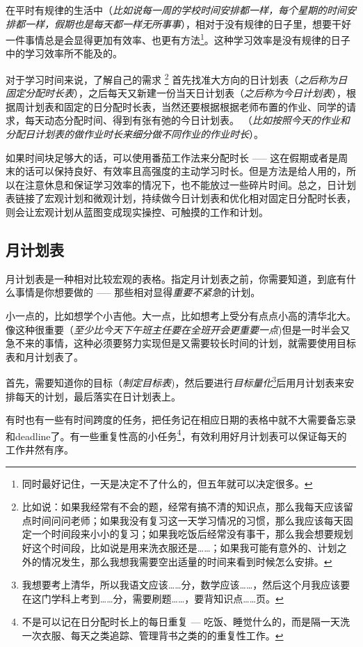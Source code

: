 \documentclass[b5paper]{ctexart}
\begin{document}
			在平时有规律的生活中（\emph{比如说每一周的学校时间安排都一样，每个星期的时间安排都一样，假期也是每天都一样{\color[gray]{0.5}无所事事}}），相对于没有规律的日子里，想要干好一件事情总是会显得更加有效率、也更有方法\footnote{同时最好记住，一天是决定不了什么的，但五年就可以决定很多。}。这种学习效率是没有规律的日子中的学习效率所不能及的。

			对于学习时间来说，了解自己的需求
			\footnote{比如说：如果我经常有不会的题，经常有搞不清的知识点，那么我每天应该留点时间问问老师；如果我没有复习这一天学习情况的习惯，那么我应该每天固定一个时间段来小小的复习；如果我吃饭后经常没有事干，那么我会想要规划好这个时间段，比如说是用来洗衣服还是\ldots\ldots{}；如果我可能有意外的、计划之外的情况发生，那么我想我需要空出适量的时间来看到时候怎么安排。}
			首先找准大方向的日计划表（\emph{之后称为日固定分配时长表}），之后每天又新建一份当天日计划表（\emph{之后称为今日计划表}），根据周计划表和固定的日分配时长表，当然还要根据根据老师布置的作业、同学的请求，每天动态分配时间、得到有张有弛的今日计划表。
			（\emph{比如按照今天的作业和分配日计划表的\emph{做作业时长}来细分做不同作业的作业时长}）。

			如果时间块足够大的话，可以使用番茄工作法来分配时长 ----- 这在假期或者是周末的话可以保持良好、有效率且高强度的主动学习时长。但是方法是给人用的，所以在注意休息和保证学习效率的情况下，也不能放过一些碎片时间。总之，日计划表链接了宏观计划和微观计划，持续做今日计划表和优化相对固定日分配时长表，则会让宏观计划从蓝图变成现实操控、可触摸的工作和计划。

		\subsection{月计划表}
			月计划表是一种相对比较宏观的表格。指定月计划表之前，你需要知道，到底有什么事情是你想要做的 ----- 那些相对显得\emph{重要不紧急}的计划。

			小一点的，比如想学个小吉他。大一点，比如想考上受分有点点小高的清华北大。像这种很重要（\emph{至少比今天下午班主任要在全班开会更重要一点})但是一时半会又急不来的事情，这种必须要努力实现但是又需要较长时间的计划，就需要使用目标表和月计划表了。

			首先，需要知道你的目标（\emph{制定目标表})，然后要进行\emph{目标量化}\footnote{我想要考上清华，所以我语文应该\ldots\ldots{}分，数学应该\ldots\ldots{}，然后这个月我应该要在这门学科上考到\ldots\ldots{}分，需要刷题\ldots\ldots{}，要背知识点\ldots\ldots{}页。}后用月计划表来安排每天的计划，最后落实在日计划表上。

			有时也有一些有时间跨度的任务，把任务记在相应日期的表格中就不大需要备忘录和deadline了。有一些重复性高的小任务\footnote{不是可以记在日分配时长上的每日重复 --- 吃饭、睡觉什么的，而是隔一天洗一次衣服、每天之类追踪、管理背书之类的的重复性工作。}，有效利用好月计划表可以保证每天的工作井然有序。
\end{document}
